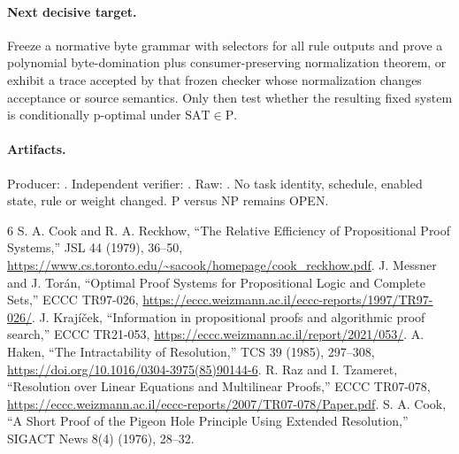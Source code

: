 \documentclass[11pt]{article}
\begin{document}
\paragraph{Next decisive target.}
Freeze a normative byte grammar with selectors for all rule outputs and prove a polynomial byte-domination plus consumer-preserving normalization theorem, or exhibit a trace accepted by that frozen checker whose normalization changes acceptance or source semantics.  Only then test whether the resulting fixed system is conditionally p-optimal under $\mathrm{SAT}\in\mathrm P$.

\paragraph{Artifacts.}
Producer: .  Independent verifier: .  Raw: .  No task identity, schedule, enabled state, rule or weight changed.  P versus NP remains OPEN.

\begin{thebibliography}{6}
 S. A. Cook and R. A. Reckhow, ``The Relative Efficiency of Propositional Proof Systems,'' JSL 44 (1979), 36--50, \url{https://www.cs.toronto.edu/~sacook/homepage/cook_reckhow.pdf}.
 J. Messner and J. Tor\'an, ``Optimal Proof Systems for Propositional Logic and Complete Sets,'' ECCC TR97-026, \url{https://eccc.weizmann.ac.il/eccc-reports/1997/TR97-026/}.
 J. Kraj\'i\v cek, ``Information in propositional proofs and algorithmic proof search,'' ECCC TR21-053, \url{https://eccc.weizmann.ac.il/report/2021/053/}.
 A. Haken, ``The Intractability of Resolution,'' TCS 39 (1985), 297--308, \url{https://doi.org/10.1016/0304-3975(85)90144-6}.
 R. Raz and I. Tzameret, ``Resolution over Linear Equations and Multilinear Proofs,'' ECCC TR07-078, \url{https://eccc.weizmann.ac.il/eccc-reports/2007/TR07-078/Paper.pdf}.
 S. A. Cook, ``A Short Proof of the Pigeon Hole Principle Using Extended Resolution,'' SIGACT News 8(4) (1976), 28--32.
\end{thebibliography}
\end{document}
